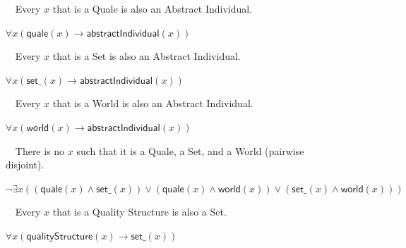 \documentclass{article}
\newcommand{\AxLabel}{a}
\newcounter{cntax}
\newcommand{\myax}[1]{\refstepcounter{cntax}{\bf \small \AxLabel\thecntax}\label{#1}$\,\,\,\,$}
\newcommand{\me}[1]{\textsf{#1}}
\begin{document}
\begin{itemize}
    \item[\myax{ax_abstractIndividual_taxonomy_quale}] Every $x$ that is a \me{Quale} is also an \me{Abstract Individual}.
    
    $\forall x(\textsf{quale}(x)\rightarrow \textsf{abstractIndividual}(x))$
    
    

    \item[\myax{ax_abstractIndividual_taxonomy_set}] Every $x$ that is a \me{Set} is also an \me{Abstract Individual}.
    
    $\forall x(\textsf{set\_}(x)\rightarrow \textsf{abstractIndividual}(x))$
    
    

    \item[\myax{ax_abstractIndividual_taxonomy_world}] Every $x$ that is a \me{World} is also an \me{Abstract Individual}.
    
    $\forall x(\textsf{world}(x)\rightarrow \textsf{abstractIndividual}(x))$
    
    

    \item[\myax{ax_abstractIndividual_pairwiseDisjoint}] There is no $x$ such that it is a \me{Quale}, a \me{Set}, and a \me{World} (pairwise disjoint).
    
    $\neg \exists x((\textsf{quale}(x)\wedge \textsf{set\_}(x))\vee (\textsf{quale}(x)\wedge \textsf{world}(x))\vee (\textsf{set\_}(x)\wedge \textsf{world}(x)))$
    
    

    \item[\myax{ax_set_taxonomy_qualityStructure}] Every $x$ that is a \me{Quality Structure} is also a \me{Set}.
    
    $\forall x(\textsf{qualityStructure}(x)\rightarrow \textsf{set\_}(x))$
    
    


\end{itemize}
\end{document}
